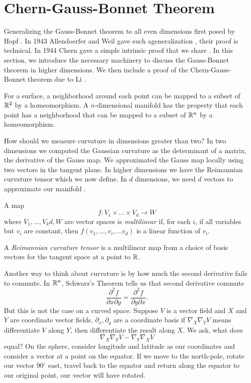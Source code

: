 \section{Chern-Gauss-Bonnet Theorem}
\label{sec:chern-gauss-bonnet}

Generalizing the Gauss-Bonnet theorem to all even dimensions
first posed by Hopf \cite{hopf_uber_1926}.
In 1943 Allendoerfer and Weil gave such ageneralization \cite{},
their proof is technical. In 1944 Chern gave a simple intrinsic proof
that we share \cite{chern_simple_1944}. In this section, we introduce
the necessary machinery to discuss the Gauss-Bonnet theorem in higher
dimensions. We then include a proof of the Chern-Gauss-Bonnet theorem
due to Li \cite{li_gauss-bonnet-chern_2011}. 

For a surface, a neighborhood around each point can be mapped 
 to a subset of $\mathbb{R}^2$ by a  homeomorphism. A $n$-dimensional manifold has
the property that each point has a neighborhood that can be mapped
to a subset of $\mathbb{R}^n$ by a homeomorphism.


How should we measure curvature in dimensions greater than two?
In two dimensions we computed the Gaussian curvature as the determinant of
a matrix, the derivative of the Gauss map. We approximated the Gauss map
locally using two vectors in the tangent plane.
In higher dimensions we have the Reimannian curvature tensor which we now define.
In $d$ dimensions, we need $d$ vectors to approximate our manifold .



A map 
$$f:V_1\times \ldots \times V_d\rightarrow W$$ where $V_1,\ldots, V_kd,W$ are vector spaces
is \emph{multilinear} if, for each $i$, if all variables but $v_i$ are constant, then $f(v_1,\ldots ,v_i,\ldots
v_d)$ is a linear function of $v_i.$

A \emph{Reimannian curvature tensor } is a multilinear map from a choice of basis vectors for the tangent
space at a point to $\mathbb{R}$. 


Another way to think about curvature is by how much the second derivative fails
to commute. In $\mathbb{R}^n$, Schwarz's Theorem tells us that second derivative commute
$$\frac{\partial^2 f}{\partial x\partial y}=\frac{\partial^2 f}{\partial y\partial x}.$$
But this is not the case on a curved space. Suppose $V$ is a vector field and $X$ and $Y$
are coordinate vector fields, $\partial_x,\partial_y$ are
a coordinate basis if $\nabla_X \nabla_Y V$ means differentiate $V$ along $Y$, then differentiate
the result along $X.$
We ask, what does 
$$\nabla_X\nabla_YV-\nabla_Y\nabla_X V$$
equal?
On the sphere, consider longitude and latitude as our coordinates and consider
a vector at a point on the equator. If we move to the north-pole, rotate our vector 90$^\circ$ east,
travel back to the equator and return along the equator to our original point, our vector will have rotated.

